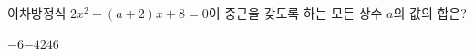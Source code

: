 이차방정식 $2x^2-(a+2)x+8=0$이 중근을 갖도록 하는 모든 상수 $a$의 값의 합은?
\begin{choices32}{$-6$}{$-4$}{$2$}{$4$}{$6$}\end{choices32}
